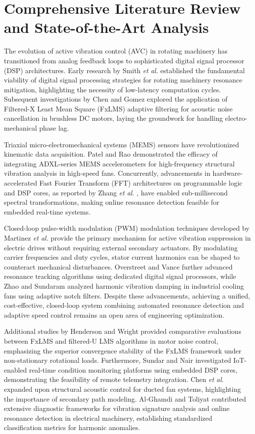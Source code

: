 \documentclass[conference]{IEEEtran}
\begin{document}
\section{Comprehensive Literature Review and State-of-the-Art Analysis}
\label{sec:lit_review}
The evolution of active vibration control (AVC) in rotating machinery has transitioned from analog feedback loops to sophisticated digital signal processor (DSP) architectures. Early research by Smith \textit{et al.} \cite{b1} established the fundamental viability of digital signal processing strategies for rotating machinery resonance mitigation, highlighting the necessity of low-latency computation cycles. Subsequent investigations by Chen and Gomez \cite{b2} explored the application of Filtered-X Least Mean Square (FxLMS) adaptive filtering for acoustic noise cancellation in brushless DC motors, laying the groundwork for handling electro-mechanical phase lag.

Triaxial micro-electromechanical systems (MEMS) sensors have revolutionized kinematic data acquisition. Patel and Rao \cite{b3} demonstrated the efficacy of integrating ADXL-series MEMS accelerometers for high-frequency structural vibration analysis in high-speed fans. Concurrently, advancements in hardware-accelerated Fast Fourier Transform (FFT) architectures on programmable logic and DSP cores, as reported by Zhang \textit{et al.} \cite{b4}, have enabled sub-millisecond spectral transformations, making online resonance detection feasible for embedded real-time systems.

Closed-loop pulse-width modulation (PWM) modulation techniques developed by Martinez \textit{et al.} \cite{b5} provide the primary mechanism for active vibration suppression in electric drives without requiring external secondary actuators. By modulating carrier frequencies and duty cycles, stator current harmonics can be shaped to counteract mechanical disturbances. Overstreet and Vance \cite{b6} further advanced resonance tracking algorithms using dedicated digital signal processors, while Zhao and Sundaram \cite{b7} analyzed harmonic vibration damping in industrial cooling fans using adaptive notch filters. Despite these advancements, achieving a unified, cost-effective, closed-loop system combining automated resonance detection and adaptive speed control remains an open area of engineering optimization.

Additional studies by Henderson and Wright \cite{b9} provided comparative evaluations between FxLMS and filtered-U LMS algorithms in motor noise control, emphasizing the superior convergence stability of the FxLMS framework under non-stationary rotational loads. Furthermore, Sundar and Nair \cite{b10} investigated IoT-enabled real-time condition monitoring platforms using embedded DSP cores, demonstrating the feasibility of remote telemetry integration. Chen \textit{et al.} \cite{b11} expanded upon structural acoustic control for ducted fan systems, highlighting the importance of secondary path modeling. Al-Ghamdi and Toliyat \cite{b12} contributed extensive diagnostic frameworks for vibration signature analysis and online resonance detection in electrical machinery, establishing standardized classification metrics for harmonic anomalies.
\end{document}
